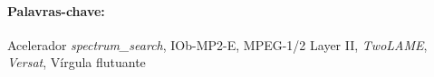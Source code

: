 \paragraph{\hspace{0.5cm} \Large{Palavras-chave:}} Acelerador \textit{spectrum\_search}, IOb-MP2-E, MPEG-1/2 Layer II, \textit{TwoLAME}, \textit{Versat}, Vírgula flutuante